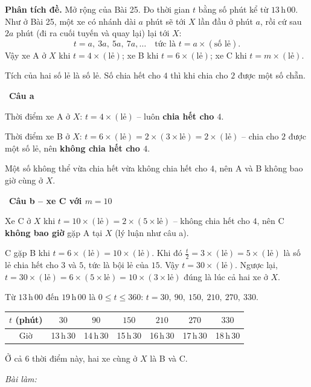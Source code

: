 \documentclass[11pt]{article}
\newif\ifsol \solfalse
\newcommand{\probsol}[1]{%
  \begin{lrbox}{\solmeasure}\begin{minipage}{\dimexpr\linewidth-24pt\relax}#1\end{minipage}\end{lrbox}%
  \ifsol
    \begin{solbox}#1\end{solbox}%
  \else
    \setlength{\solht}{\dimexpr\ht\solmeasure+\dp\solmeasure+0.85cm\relax}%
    \ifdim\solht<1.35cm\setlength{\solht}{1.35cm}\fi
    \ifdim\solht>\StudentMaxWork\setlength{\solht}{\StudentMaxWork}\fi
    \begin{tcolorbox}[colback=white,colframe=Line,boxrule=0.8pt,arc=5pt,
      left=8pt,right=8pt,top=4pt,bottom=4pt,height=\solht]{\footnotesize\color{Slate}\itshape\WorkWord}\end{tcolorbox}%
  \fi}
\newlength{\StudentMaxWork}\setlength{\StudentMaxWork}{7.5cm}
\newcommand{\step}[2]{\par\smallskip\noindent{\bfseries\color{tmBlue!85!black}\StepWord~#1.}\ {\bfseries #2}\par\nopagebreak}
\def\WorkWord{Bài làm:}
\def\StepWord{Bước}
\begin{document}
\probsol{
\textbf{Phân tích đề.} Mở rộng của Bài 25. Đo thời gian $t$ bằng số phút kể từ $13$\,h\,$00$. Như ở Bài 25, một xe có nhánh dài $a$ phút sẽ tới $X$ lần đầu ở phút $a$, rồi cứ sau $2a$ phút (đi ra cuối tuyến và quay lại) lại tới $X$:
\[ t=a,\ 3a,\ 5a,\ 7a,\dots \quad\text{tức là } t=a\times(\text{số lẻ}). \]
Vậy xe A ở $X$ khi $t=4\times(\text{lẻ})$; xe B khi $t=6\times(\text{lẻ})$; xe C khi $t=m\times(\text{lẻ})$.
\begin{recallbox}Tích của hai số lẻ là số lẻ. Số chia hết cho $4$ thì khi chia cho $2$ được một số chẵn.\end{recallbox}

\step{1}{Câu a}
Thời điểm xe A ở $X$: $t=4\times(\text{lẻ})$ -- luôn \textbf{chia hết cho $4$}.\par
Thời điểm xe B ở $X$: $t=6\times(\text{lẻ})=2\times(3\times\text{lẻ})=2\times(\text{lẻ})$ -- chia cho $2$ được một số lẻ, nên \textbf{không chia hết cho $4$}.\par
Một số không thể vừa chia hết vừa không chia hết cho $4$, nên A và B không bao giờ cùng ở $X$.

\step{2}{Câu b -- xe C với $m=10$}
Xe C ở $X$ khi $t=10\times(\text{lẻ})=2\times(5\times\text{lẻ})$ -- không chia hết cho $4$, nên C \textbf{không bao giờ} gặp A tại $X$ (lý luận như câu a).\par
C gặp B khi $t=6\times(\text{lẻ})=10\times(\text{lẻ})$. Khi đó $\frac{t}{2}=3\times(\text{lẻ})=5\times(\text{lẻ})$ là số lẻ chia hết cho $3$ và $5$, tức là bội lẻ của $15$. Vậy $t=30\times(\text{lẻ})$. Ngược lại, $t=30\times(\text{lẻ})=6\times(5\times\text{lẻ})=10\times(3\times\text{lẻ})$ đúng là lúc cả hai xe ở $X$.\par
Từ $13$\,h\,$00$ đến $19$\,h\,$00$ là $0\le t\le 360$: $t=30,\ 90,\ 150,\ 210,\ 270,\ 330$.
\begin{center}
\begin{tabular}{|c|c|c|c|c|c|c|}
\hline
\rowcolor{tmBlue!10}$t$ (phút) & $30$ & $90$ & $150$ & $210$ & $270$ & $330$\\ \hline
Giờ & 13\,h\,30 & 14\,h\,30 & 15\,h\,30 & 16\,h\,30 & 17\,h\,30 & 18\,h\,30\\ \hline
\end{tabular}
\end{center}
Ở cả $6$ thời điểm này, hai xe cùng ở $X$ là B và C.

}
\end{document}
